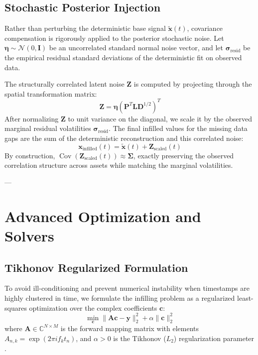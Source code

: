 \documentclass[11pt,a4paper]{article}
\begin{document}
\subsection{Stochastic Posterior Injection}
Rather than perturbing the deterministic base signal $\tilde{\mathbf{x}}(t)$, covariance compensation is rigorously applied to the posterior stochastic noise. Let $\boldsymbol{\eta} \sim \mathcal{N}(0, \mathbf{I})$ be an uncorrelated standard normal noise vector, and let $\boldsymbol{\sigma}_{\text{resid}}$ be the empirical residual standard deviations of the deterministic fit on observed data.

The structurally correlated latent noise $\mathbf{Z}$ is computed by projecting through the spatial transformation matrix:
\begin{equation}
\mathbf{Z} = \boldsymbol{\eta} \left( \mathbf{P}^T \mathbf{L} \mathbf{D}^{1/2} \right)^T
\end{equation}
After normalizing $\mathbf{Z}$ to unit variance on the diagonal, we scale it by the observed marginal residual volatilities $\boldsymbol{\sigma}_{\text{resid}}$. The final infilled values for the missing data gaps are the sum of the deterministic reconstruction and this correlated noise:
\begin{equation}
\mathbf{x}_{\text{infilled}}(t) = \tilde{\mathbf{x}}(t) + \mathbf{Z}_{\text{scaled}}(t)
\end{equation}
By construction, $\operatorname{Cov}(\mathbf{Z}_{\text{scaled}}(t)) \approx \boldsymbol{\Sigma}$, exactly preserving the observed correlation structure across assets while matching the marginal volatilities.

---

\section{Advanced Optimization and Solvers}

\subsection{Tikhonov Regularized Formulation}
To avoid ill-conditioning and prevent numerical instability when timestamps are highly clustered in time, we formulate the infilling problem as a regularized least-squares optimization over the complex coefficients $\mathbf{c}$:
\begin{equation}
\label{eq:tikhonov}
\min_{\mathbf{c}} \|\mathbf{A} \mathbf{c} - \mathbf{y}\|_2^2 + \alpha \|\mathbf{c}\|_2^2
\end{equation}
where $\mathbf{A} \in \mathbb{C}^{N \times M}$ is the forward mapping matrix with elements $A_{n,k} = \exp(2\pi i f_k t_n)$, and $\alpha > 0$ is the Tikhonov ($L_2$) regularization parameter \cite{Tikhonov1943}. 
\end{document}

